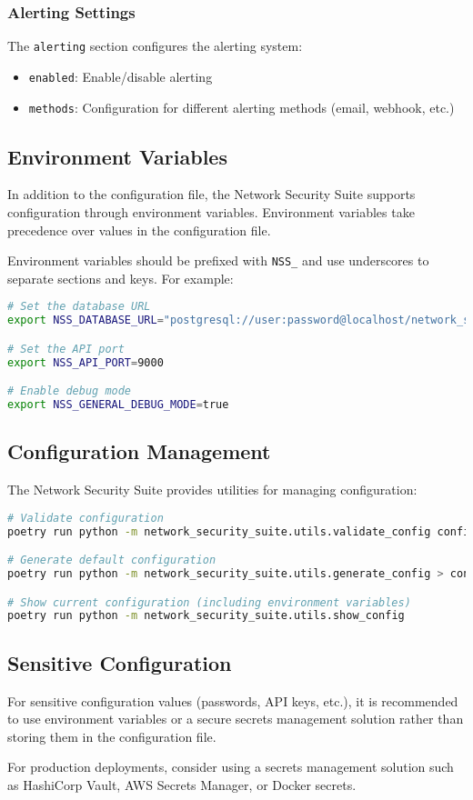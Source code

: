 \subsubsection{Alerting Settings}
The \texttt{alerting} section configures the alerting system:

\begin{itemize}
    \item \texttt{enabled}: Enable/disable alerting
    \item \texttt{methods}: Configuration for different alerting methods (email, webhook, etc.)
\end{itemize}

\subsection{Environment Variables}
In addition to the configuration file, the Network Security Suite supports configuration through environment variables. Environment variables take precedence over values in the configuration file.

Environment variables should be prefixed with \texttt{NSS\_} and use underscores to separate sections and keys. For example:

\begin{lstlisting}[language=bash, caption=Environment Variables Example]
# Set the database URL
export NSS_DATABASE_URL="postgresql://user:password@localhost/network_security"

# Set the API port
export NSS_API_PORT=9000

# Enable debug mode
export NSS_GENERAL_DEBUG_MODE=true
\end{lstlisting}

\subsection{Configuration Management}
The Network Security Suite provides utilities for managing configuration:

\begin{lstlisting}[language=bash, caption=Configuration Management Commands]
# Validate configuration
poetry run python -m network_security_suite.utils.validate_config config.yaml

# Generate default configuration
poetry run python -m network_security_suite.utils.generate_config > config.yaml

# Show current configuration (including environment variables)
poetry run python -m network_security_suite.utils.show_config
\end{lstlisting}

\subsection{Sensitive Configuration}
For sensitive configuration values (passwords, API keys, etc.), it is recommended to use environment variables or a secure secrets management solution rather than storing them in the configuration file.

For production deployments, consider using a secrets management solution such as HashiCorp Vault, AWS Secrets Manager, or Docker secrets.